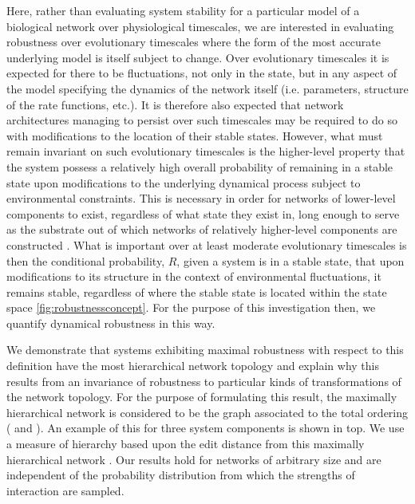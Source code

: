 Here, rather than evaluating system stability for a particular model of a biological network over physiological timescales, we are interested in evaluating robustness over evolutionary timescales where the form of the most accurate underlying model is itself subject to change. Over evolutionary timescales it is expected for there to be fluctuations, not only in the state, but in any aspect of the model specifying the dynamics of the network itself (i.e. parameters, structure of the rate functions, etc.). It is therefore also expected that network architectures managing to persist over such timescales may be required to do so with modifications to the location of their stable states. However, what must remain invariant on such evolutionary timescales is the higher-level property that the system possess a relatively high overall probability of remaining in a stable state upon modifications to the underlying dynamical process subject to environmental constraints. This is necessary in order for networks of lower-level components to exist, regardless of what state they exist in, long enough to serve as the substrate out of which networks of relatively higher-level components are constructed \cite{Simon2002}. What is important over at least moderate evolutionary timescales is then the conditional probability, $R$, given a system is in a stable state, that upon modifications to its structure in the context of environmental fluctuations, it remains stable, regardless of where the stable state is located within the state space \ref{fig:robustnessconcept}. For the purpose of this investigation then, we quantify dynamical robustness in this way.

We demonstrate that systems exhibiting maximal robustness with respect to this definition have the most hierarchical network topology and explain why this results from an invariance of robustness to particular kinds of transformations of the network topology. For the purpose of formulating this result, the maximally hierarchical network is considered to be the graph associated to the total ordering ( and \cite{Cormen2009}). An example of this for three system components is shown in  top. We use a measure of hierarchy based upon the edit distance from this maximally hierarchical network \cite{Axenovich2011}. Our results hold for networks of arbitrary size and are independent of the probability distribution from which the strengths of interaction are sampled.
